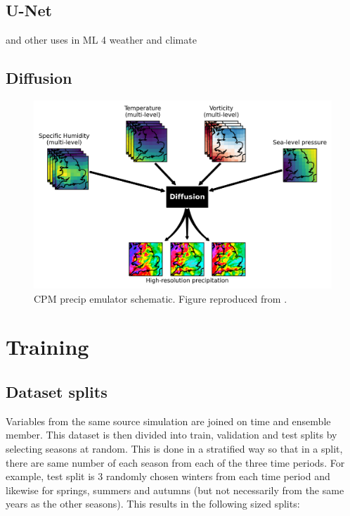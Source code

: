 \subsection{U-Net}

\textcite{Ronneberger2015unet} and other uses in ML 4 weather and climate

\subsection{Diffusion}

\textcite{song2021sbgmsde}

\begin{figure}[ht]
	\centering
	\includegraphics[height=0.35\textheight]{chapters/figures/1_intro/ai-schematic.png}
	\caption{CPM precip emulator schematic. Figure reproduced from \cite{Addison2024diffcpmprecipemul}.}
	\label{fig:diff-schematic}
\end{figure}

\section{Training}

\subsection{Dataset splits}

Variables from the same source simulation are joined on time and ensemble member. This dataset is then divided into train, validation and test splits by selecting seasons at random. This is done in a stratified way so that in a split, there are same number of each season from each of the three time periods. For example, test split is 3 randomly chosen winters from each time period and likewise for springs, summers and autumns (but not necessarily from the same years as the other seasons). This results in the following sized splits:

